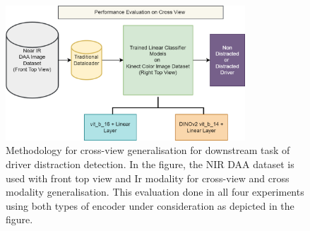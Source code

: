 \begin{figure}[h]
\begin{center}
\includegraphics[width=0.8\textwidth]{Images_Thesis/methodology_images/methodology_cross_view_generalisation.png}
\end{center}
\caption[Methodology for cross-view generalisation.]{Methodology for cross-view generalisation for downstream task of driver distraction detection. In the figure, the NIR DAA dataset is used with front top view and Ir modality for cross-view and cross modality generalisation. This evaluation done in all four experiments using both types of encoder under consideration as depicted in the figure.}
\label{fig:method_flow_chart_cross_view_gen}
\end{figure}


